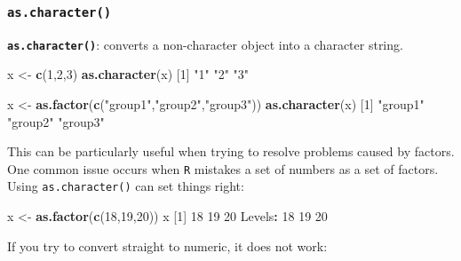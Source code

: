 \documentclass[]{book}
\newenvironment{Shaded}{\begin{snugshade}}{\end{snugshade}}
\newcommand{\DecValTok}[1]{\textcolor[rgb]{0.00,0.00,0.81}{#1}}
\newcommand{\KeywordTok}[1]{\textcolor[rgb]{0.13,0.29,0.53}{\textbf{#1}}}
\newcommand{\NormalTok}[1]{#1}
\newcommand{\OperatorTok}[1]{\textcolor[rgb]{0.81,0.36,0.00}{\textbf{#1}}}
\newcommand{\StringTok}[1]{\textcolor[rgb]{0.31,0.60,0.02}{#1}}
\begin{document}
\hypertarget{as.character}{%
\subsubsection*{\texorpdfstring{\texttt{as.character()}}{as.character()}}\label{as.character}}

\textbf{\texttt{as.character()}}: converts a non-character object into a character string.

\begin{Shaded}
\begin{Highlighting}[]
\NormalTok{x <-}\StringTok{ }\KeywordTok{c}\NormalTok{(}\DecValTok{1}\NormalTok{,}\DecValTok{2}\NormalTok{,}\DecValTok{3}\NormalTok{)}
\KeywordTok{as.character}\NormalTok{(x)}
\NormalTok{[}\DecValTok{1}\NormalTok{] }\StringTok{"1"} \StringTok{"2"} \StringTok{"3"}
\end{Highlighting}
\end{Shaded}

\begin{Shaded}
\begin{Highlighting}[]
\NormalTok{x <-}\StringTok{ }\KeywordTok{as.factor}\NormalTok{(}\KeywordTok{c}\NormalTok{(}\StringTok{"group1"}\NormalTok{,}\StringTok{"group2"}\NormalTok{,}\StringTok{"group3"}\NormalTok{))}
\KeywordTok{as.character}\NormalTok{(x)}
\NormalTok{[}\DecValTok{1}\NormalTok{] }\StringTok{"group1"} \StringTok{"group2"} \StringTok{"group3"}
\end{Highlighting}
\end{Shaded}

This can be particularly useful when trying to resolve problems caused by factors. One common issue occurs when \texttt{R} mistakes a set of numbers as a set of factors. Using \texttt{as.character()} can set things right:

\begin{Shaded}
\begin{Highlighting}[]
\NormalTok{x <-}\StringTok{ }\KeywordTok{as.factor}\NormalTok{(}\KeywordTok{c}\NormalTok{(}\DecValTok{18}\NormalTok{,}\DecValTok{19}\NormalTok{,}\DecValTok{20}\NormalTok{))}
\NormalTok{x}
\NormalTok{[}\DecValTok{1}\NormalTok{] }\DecValTok{18} \DecValTok{19} \DecValTok{20}
\NormalTok{Levels}\OperatorTok{:}\StringTok{ }\DecValTok{18} \DecValTok{19} \DecValTok{20}
\end{Highlighting}
\end{Shaded}

If you try to convert straight to numeric, it does not work:
\end{document}
